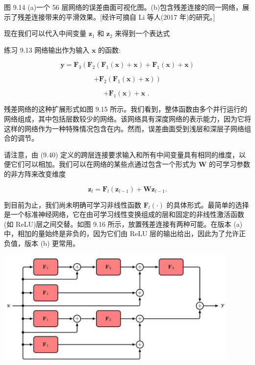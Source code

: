 \documentclass[10pt]{report}
\begin{document}
图 9.14 (a)一个 56 层网络的误差曲面可视化图。(b)包含残差连接的同一网络，展示了残差连接带来的平滑效果。[经许可摘自 Li 等人(2017 年)的研究。]

现在我们可以代入中间变量 \({\mathbf{z}}_{1}\) 和 \({\mathbf{z}}_{2}\) 来得到一个表达式

练习 9.13 网络输出作为输入 \(\mathbf{x}\) 的函数:

\[
\mathbf{y} = {\mathbf{F}}_{3}\left( {{\mathbf{F}}_{2}\left( {{\mathbf{F}}_{1}\left( \mathbf{x}\right)  + \mathbf{x}}\right)  + {\mathbf{F}}_{1}\left( \mathbf{x}\right)  + \mathbf{x}}\right)
\]

\[
\left. {+{\mathbf{F}}_{2}\left( {{\mathbf{F}}_{1}\left( \mathbf{x}\right)  + \mathbf{x}}\right) }\right)
\]

\[
+ {\mathbf{F}}_{1}\left( \mathbf{x}\right)  + \mathbf{x}\text{ . } \tag{9.40}
\]

残差网络的这种扩展形式如图 9.15 所示。我们看到，整体函数由多个并行运行的网络组成，其中包括层数较少的网络。该网络具有深度网络的表示能力，因为它将这样的网络作为一种特殊情况包含在内。然而，误差曲面受到浅层和深层子网络组合的调节。

请注意，由 (9.40) 定义的跨层连接要求输入和所有中间变量具有相同的维度，以便它们可以相加。我们可以在网络的某些点通过包含一个形式为 \(\mathbf{W}\) 的可学习参数的非方阵来改变维度

\[
{\mathbf{z}}_{l} = {\mathbf{F}}_{l}\left( {\mathbf{z}}_{l - 1}\right)  + \mathbf{W}{\mathbf{z}}_{l - 1}. \tag{9.41}
\]

到目前为止，我们尚未明确可学习非线性函数 \({\mathbf{F}}_{l}\left( \cdot \right)\) 的具体形式。最简单的选择是一个标准神经网络，它在由可学习线性变换组成的层和固定的非线性激活函数(如 ReLU)层之间交替。如图 9.16 所示，放置残差连接有两种可能。在版本 (a) 中，相加的量始终是非负的，因为它们由 ReLU 层的输出给出，因此为了允许正负值，版本 (b) 更常用。

\begin{center}
\includegraphics[max width=0.9\textwidth]{images/0194e279-9b28-703a-88f4-c3ac21e2010d_296_313_340_1167_555_0.jpg}
\end{center}
\hspace*{3em} 
\end{document}
